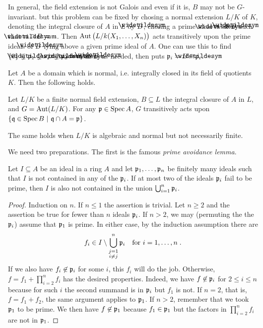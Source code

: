 \documentclass[a4paper,parskip=half,numbers=enddot, DIV=12]{scrreprt}
\renewcommand{\geq}{\geqslant}
\renewcommand{\leq}{\leqslant}
\begin{document}
	In general, the field extension is not Galois and even if it is, $B$ may not be $G$-invariant. but this problem can be fixed by chosing a normal extension $L/K$ of $K$, denoting the integral closure of $A$ in $L$ by $\snake B$, chosing a prime ideal $\snake\mm$ of $\snake B$ such that $\snake\mm \cap B = \mm$. Then $\operatorname{Aut}\big(L/k(X_1,\ldots,X_n)\big)$ acts transitively upon the prime ideals of $\snake B$ lying above a given prime ideal of $A$. One can use this to find $\{0\}\subsetneq \snake\pp_1\subsetneq \ldots\subsetneq \snake\pp_d = \snake \mm$ in $\snake B$ as needed, then puts $\pp_i= B\cap \snake\pp_i$.

	\begin{thm}
		Let $A$ be a domain which is normal, i.e. integrally closed in its field of quotients $K$. Then the following holds. 
		\begin{alphanumerate}
		\item 
			Let $L/K$ be a finite normal field extension, $B\subseteq L$ the integral closure of $A$ in $L$, and $G = \operatorname{Aut}(L/K)$. For any $\mathfrak{p}\in\operatorname{Spec} A$, $G$ transitively acts upon $\left\{\mathfrak{q}\in\operatorname{Spec} B\ \middle|\  \mathfrak{q}\cap A = \mathfrak{p}\right\}$. 
		\item
			The same holds when $L/K$ is algebraic and normal but not necessarily finite.
		\end{alphanumerate}
	\end{thm}
	We need two preparations. The first is the famous \emph{prime avoidance lemma}.
	\begin{lem}
		Let $I\subseteq A$ be an ideal in a ring $A$ and let $\mathfrak{p}_1,\ldots,\mathfrak{p}_n$ be finitely many ideals such that $I$ is not contained in any of the $\mathfrak{p}_i$. If at most two of the ideals $\mathfrak{p}_i$ fail to be prime, then $I$ is also not contained in the union $\bigcup_{i=1}^n\mathfrak{p}_i$.
	\end{lem}
	\begin{proof}
		Induction on $n$. If $n\leq 1$ the assertion is trivial. Let $n\geq 2$ and the assertion be true for fewer than $n$ ideals $\mathfrak{p}_i$. If $n>2$, we may (permuting the the $\mathfrak{p}_i$) assume that $\mathfrak{p}_1$ is prime. In either case, by the induction assumption there are 
		\begin{align*}
			f_i\in I\setminus \bigcup_{\substack{j = 1\\i\not=j}}^n \mathfrak{p}_i\quad\text{for }i=1,\ldots,n\;. 
		\end{align*}
		If we also have $f_i\not \in \mathfrak{p}_i$ for some $i$, this $f_i$ will do the job. Otherwise, $f= f_1+\prod_{i=2}^nf_i$ has the desired properties. Indeed, we have $f\not\in\mathfrak{p}_i$ for $2\leq i\leq n$ because for such $i$ the second summand is in $\mathfrak{p}_i$ but $f_1$ is not. If $n=2$, that is, $f=f_1+f_2$, the same argument applies to $\mathfrak{p}_1$. If $n>2$, remember that we took $\mathfrak{p}_1$ to be prime. We then have $f\not\in \mathfrak{p}_1$ because $f_1\in\mathfrak{p}_1$ but the factors in $\prod_{i=2}^nf_i$ are not in $\mathfrak{p}_1$.
	\end{proof}
\end{document}
